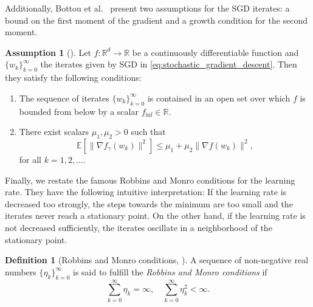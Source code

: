 \documentclass[12pt]{article}
\theoremstyle{definition}
\newtheorem{definition}[definition]{Definition}
\newtheorem{assumption}[assumption]{Assumption}
\numberwithin{equation}{section}
\newcommand{\R}{\mathbb{R}}
\newcommand{\ev}[1]{\mathbb{E}\left[{#1}\right]}
\newcommand{\norm}[1]{\lVert{#1}\rVert_2}
\begin{document}
 Additionally, Bottou et al.\ \cite{bottouOptimizationMethodsLargeScale2018} present two assumptions for the SGD iterates: a bound on the first moment of the gradient and a growth condition for the second moment.
\begin{assumption}[]
  \label{as:sgd_convergence}
  Let $f : \R^d \rightarrow \R$ be a continuously differentiable function and $\{w_k\}_{k=0}^\infty$ the iterates given by SGD in \eqref{eq:stochastic_gradient_descent}. Then they satisfy the following conditions:
  \begin{enumerate}[label=(\roman*)]
    \item The sequence of iterates $\{w_k\}_{k=0}^\infty$ is contained in an open set over which $f$ is bounded from below by a scalar $f_{\text{inf}}\in \R$.
    \item There exist scalars $\mu_1, \mu_2 > 0$ such that 
    \begin{equation*}
      \label{eq:variance_linear_growth}
      \ev{\lVert \nabla f_{\gamma}(w_k) \rVert^2} \leq \mu_1 + \mu_2 \lVert \nabla f(w_k) \rVert^2,
    \end{equation*}
    for all $k=1,2,\dots$.
  \end{enumerate}
\end{assumption}

Finally, we restate the famous Robbins and Monro conditions for the learning rate. They have the following intuitive interpretation: If the learning rate is decreased too strongly, the steps towards the minimum are too small and the iterates never reach a stationary point. On the other hand, if the learning rate is not decreased sufficiently, the iterates oscillate in a neighborhood of the stationary point.
\begin{definition}[Robbins and Monro conditions, \cite{robbinsStochasticApproximationMethod1951}]
  A sequence of non-negative real numbers $\{\eta_k\}_{k=0}^\infty$ is said to fulfill the \emph{Robbins and Monro conditions} if
  \begin{equation*}
    \sum_{k=0}^\infty \eta_k = \infty, \quad \sum_{k=0}^\infty \eta_k^2 < \infty.
  \end{equation*}
\end{definition}
\end{document}

